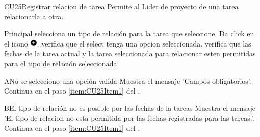 \begin{UseCase}{CU25}{Registrar relacion de tarea}{
		Permite al Lider de proyecto de una tarea relacionarla a otra.
	}
	\end{UseCase}
	\begin{UCtrayectoria}{Principal}
		\UCpaso [\UCactor] selecciona un tipo de relación para la tarea que seleccione.
		\UCpaso[\UCactor] Da click en el icono \includegraphics[height=10pt]{./images/iconos/ic_add_circle_black_18dp.png}. \label{item:CU25Item1}
        \UCpaso [\UCsist] verifica que el select tenga una opcion seleccionada. 
        \UCpaso [\UCsist] verifica que las fechas de la tarea actual y la tarea seleccionada para relacionar esten permitidas para el tipo de relación seleccionada. 
	\end{UCtrayectoria}
\begin{UCtrayectoriaA}{A}{No se selecciono una opción valida}
			\UCpaso [\UCsist] Muestra el mensaje 'Campos obligatorios'.
			\UCpaso [\UCsist] Continua en el paso \ref{item:CU25Item1} del .
		\end{UCtrayectoriaA}
		
		\begin{UCtrayectoriaA}{B}{El tipo de relación no es posible por las fechas de la tareas}
			\UCpaso [\UCsist] Muestra el mensaje 'El tipo de relacion no esta permitida por las fechas registradas para las tareas.'.
			\UCpaso [\UCsist] Continua en el paso \ref{item:CU25Item1} del .
		\end{UCtrayectoriaA}		
		
